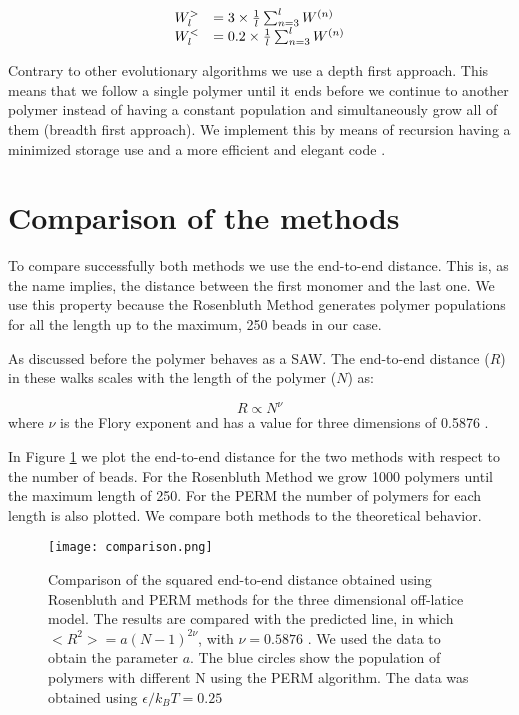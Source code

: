\documentclass[aps,prl,reprint,groupedaddress]{revtex4-1}
\begin{document}
\begin{equation}
\begin{array}{l l}
	W_l^> &= 3 \times \frac{1}{l}\sum_{n=3}^l W^{(n)} \\
    W_l^< &= 0.2 \times \frac{1}{l}\sum_{n=3}^l W^{(n)}
\end{array}
\end{equation}

Contrary to other evolutionary algorithms we use a depth first approach. This means that we follow a single polymer until it ends before we continue to another polymer instead of having a constant population and simultaneously grow all of them (breadth first approach). We implement this by means of recursion having a minimized storage use and a more efficient and elegant code \cite{Grassberger1997}.

\section{Comparison of the methods}

To compare successfully both methods we use the end-to-end distance. This is, as the name implies, the distance between the first monomer and the last one. We use this property because the Rosenbluth Method generates polymer populations for all the length up to the maximum, 250 beads in our case. 

As discussed before the polymer behaves as a SAW. The end-to-end distance ($R$) in these walks scales with the length of the polymer ($N$) as:

\begin{equation}
	R \propto N^\nu
\end{equation}
where $\nu$ is the Flory exponent and has a value for three dimensions of 0.5876 \cite{Clisby2010}.

In Figure \ref{comparison} we plot the end-to-end distance for the two methods with respect to the number of beads. For the Rosenbluth Method we grow 1000 polymers until the maximum length of 250. For the PERM the number of polymers for each length is also plotted. We compare both methods to the theoretical behavior. 

\begin{figure}[tb]
	\texttt{[image: comparison.png]}
	\caption{Comparison of the squared end-to-end distance obtained using Rosenbluth and PERM methods for the three dimensional off-latice model. The results are compared with the predicted line, in which $<R^2> = a(N-1)^{2 \nu}$, with $\nu = 0.5876$ \cite{Clisby2010}. We used the data to obtain the parameter $a$. The blue circles show the population of polymers with different N using the PERM algorithm. The data was obtained using $\epsilon/k_B T = 0.25$\label{comparison}}
\end{figure}
\end{document}
